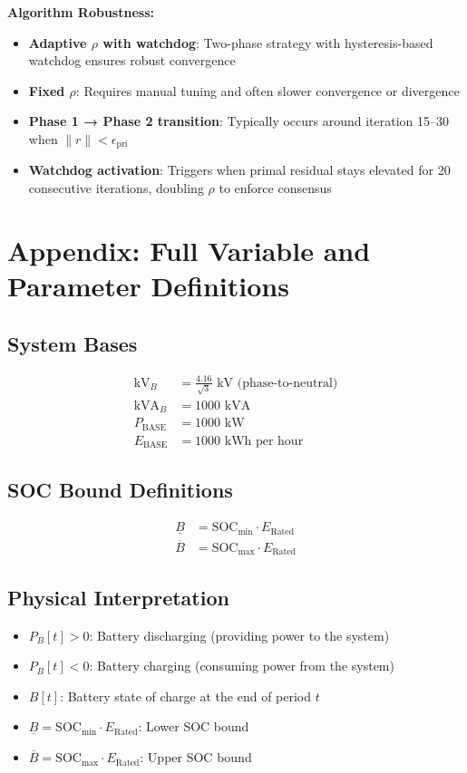 \documentclass[11pt]{article}
\begin{document}
\textbf{Algorithm Robustness:}
\begin{itemize}
    \item \textbf{Adaptive $\rho$ with watchdog}: Two-phase strategy with hysteresis-based watchdog ensures robust convergence
    \item \textbf{Fixed $\rho$}: Requires manual tuning and often slower convergence or divergence
    \item \textbf{Phase 1 → Phase 2 transition}: Typically occurs around iteration 15--30 when $\|r\| < \epsilon_{\text{pri}}$
    \item \textbf{Watchdog activation}: Triggers when primal residual stays elevated for 20 consecutive iterations, doubling $\rho$ to enforce consensus
\end{itemize}

\clearpage

\section{Appendix: Full Variable and Parameter Definitions}

\subsection{System Bases}
\begin{align}
\text{kV}_B &= \frac{4.16}{\sqrt{3}} \text{ kV (phase-to-neutral)} \\
\text{kVA}_B &= 1000 \text{ kVA} \\
P_{\text{BASE}} &= 1000 \text{ kW} \\
E_{\text{BASE}} &= 1000 \text{ kWh per hour}
\end{align}

\subsection{SOC Bound Definitions}
\begin{align}
\underline{B} &= \text{SOC}_{\min} \cdot E_{\text{Rated}} \\
\overline{B} &= \text{SOC}_{\max} \cdot E_{\text{Rated}}
\end{align}

\subsection{Physical Interpretation}
\begin{itemize}
    \item $P_B[t] > 0$: Battery discharging (providing power to the system)
    \item $P_B[t] < 0$: Battery charging (consuming power from the system)
    \item $B[t]$: Battery state of charge at the end of period $t$
    \item $\underline{B} = \text{SOC}_{\min} \cdot E_{\text{Rated}}$: Lower SOC bound
    \item $\overline{B} = \text{SOC}_{\max} \cdot E_{\text{Rated}}$: Upper SOC bound
\end{itemize}
\end{document}
